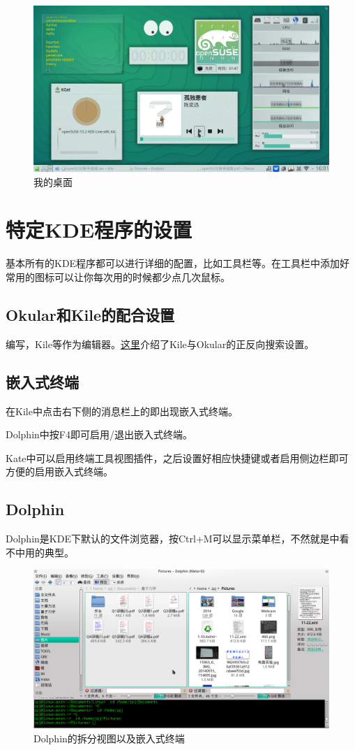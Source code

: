 \documentclass[11pt,openany]{book}
\newcommand{\menu}[1]{\fbox{#1}}
\begin{document}
\begin{figure}[htb]
 \centering
 \includegraphics[width=\textwidth]{./pic/desktop.png}
 \caption{我的桌面}\label{mydesk}
\end{figure}

\section{特定KDE程序的设置}
基本所有的KDE程序都可以进行详细的配置，比如工具栏等。在工具栏中添加好常用的图标可以让你每次用的时候都少点几次鼠标。
\subsection{Okular和Kile的配合设置}
编写，Kile等作为编辑器。\href{http://zpj.blog.ustc.edu.cn/?p=338}{这里}介绍了Kile与Okular的正反向搜索设置。

\subsection{嵌入式终端}
在Kile中点击右下侧的消息栏上的\menu{Konsole}即出现嵌入式终端。

Dolphin中按F4即可启用/退出嵌入式终端。

Kate中可以启用终端工具视图插件，之后设置好相应快捷键或者启用侧边栏即可方便的启用嵌入式终端。
\subsection{Dolphin}
Dolphin是KDE下默认的文件浏览器，按Ctrl+M可以显示菜单栏，不然就是中看不中用的典型。
\begin{figure}[htb]
\centering
\includegraphics[width=\textwidth]{./pic/dolphin.png} 
\caption{Dolphin的拆分视图以及嵌入式终端}
\end{figure}
\end{document}
